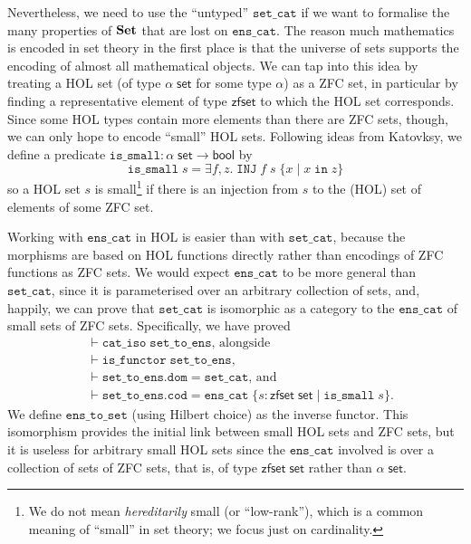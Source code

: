 \documentclass[twoside,titlepage,11pt]{article}
\begin{document}
Nevertheless, we need to use the ``untyped'' $\mathtt{set\_cat}$ if we want to formalise the many properties of $\mathbf{Set}$ that are lost on $\mathtt{ens\_cat}$.
The reason much mathematics is encoded in set theory in the first place is that the universe of sets supports the encoding of almost all mathematical objects.
We can tap into this idea by treating a HOL set (of type $\alpha\;\mathsf{set}$ for some type $\alpha$) as a ZFC set, in particular by finding a representative element of type $\mathsf{zfset}$ to which the HOL set corresponds.
Since some HOL types contain more elements than there are ZFC sets, though, we can only hope to encode ``small'' HOL sets.
Following ideas from Katovksy, we define a predicate $\mathtt{is\_small}:\alpha\;\mathsf{set}\to\mathsf{bool}$ by $$\mathtt{is\_small}\;s=\exists{f,z}.\;\mathtt{INJ}\;f\;s\;\{x\mid x\operatorname{\mathtt{in}} z\}$$ so a HOL set $s$ is small\footnote{We do not mean \emph{hereditarily} small (or ``low-rank''), which is a common meaning of ``small'' in set theory; we focus just on cardinality.} if there is an injection from $s$ to the (HOL) set of elements of some ZFC set.

Working with $\mathtt{ens\_cat}$ in HOL is easier than with $\mathtt{set\_cat}$, because the morphisms are based on HOL functions directly rather than encodings of ZFC functions as ZFC sets.
We would expect $\mathtt{ens\_cat}$ to be more general than $\mathtt{set\_cat}$, since it is parameterised over an arbitrary collection of sets, and, happily, we can prove that $\mathtt{set\_cat}$ is isomorphic as a category to the $\mathtt{ens\_cat}$ of small sets of ZFC sets.
Specifically, we have proved
\begin{align*}
&\vdash\mathtt{cat\_iso}\;\mathtt{set\_to\_ens}\text{, alongside}\\
&\vdash\mathtt{is\_functor}\;\mathtt{set\_to\_ens}\text{,}\\
&\vdash\mathtt{set\_to\_ens}.\mathtt{dom}=\mathtt{set\_cat}\text{, and}\\
&\vdash\mathtt{set\_to\_ens}.\mathtt{cod}=\mathtt{ens\_cat}\;\{s:\mathsf{zfset}\;\mathsf{set}\mid\mathtt{is\_small}\;s\}\text{.}
\end{align*}
We define $\mathtt{ens\_to\_set}$ (using Hilbert choice) as the inverse functor.
This isomorphism provides the initial link between small HOL sets and ZFC sets, but it is useless for arbitrary small HOL sets since the $\mathtt{ens\_cat}$ involved is over a collection of sets of ZFC sets, that is, of type $\mathsf{zfset}\;\mathsf{set}$ rather than $\alpha\;\mathsf{set}$.
\end{document}
